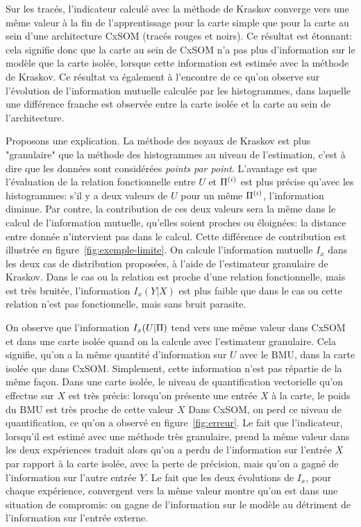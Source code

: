 Sur les tracés, l'indicateur calculé avec la méthode de Kraskov converge vers une même valeur à la fin de l'apprentissage pour la carte simple que pour la carte au sein d'une architecture CxSOM (tracés rouges et noirs). Ce résultat est étonnant: cela signifie donc que la carte au sein de CxSOM n'a pas plus d'information sur le modèle que la carte isolée, lorsque cette information est estimée avec la méthode de Kraskov. Ce résultat va également à l'encontre de ce qu'on observe sur l'évolution de l'information mutuelle calculée par les histogrammes, dans laquelle une différence franche est observée entre la carte isolée et la carte au sein de l'architecture.

Proposons une explication.
La méthode des noyaux de Kraskov est plus "granulaire" que la méthode des histogrammes au niveau de l'estimation, c'est à dire que les données sont considérées \emph{points par point}. L'avantage est que l'évaluation de la relation fonctionnelle entre $U$ et $\Pi^{({i})}$ est plus précise qu'avec les histogrammes: s'il y a deux valeurs de $U$ pour un même $\Pi^{({i})}$, l'information diminue. Par contre, la contribution de ces deux valeurs sera la même dans le calcul de l'information mutuelle, qu'elles soient proches ou éloignées: la distance entre donnée n'intervient pas dans le calcul. Cette différence de contribution est illustrée en figure~\ref{fig:exemple-limite}. On calcule l'information mutuelle $I_x$ dans les deux cas de distribution proposées, à l'aide de l'estimateur granulaire de Kraskov. Dans le cas ou la relation est proche d'une relation fonctionnelle, mais est très bruitée, l'information $I_x(Y|X)$ est plus faible que dans le cas ou cette relation n'est pas fonctionnelle, mais sans bruit parasite.

On observe que l'information $I_x(U|\Pi)$ tend vers une même valeur dans CxSOM et dans une carte isolée quand on la calcule avec l'estimateur granulaire. Cela signifie, qu'on a la même quantité d'information sur $U$ avec le BMU, dans la carte isolée que dans CxSOM. Simplement, cette information n'est pas répartie de la même façon. 
Dans une carte isolée, le niveau de quantification vectorielle qu'on effectue sur $X$ est très précis: lorsqu'on présente une entrée $X$ à la carte, le poids du BMU est très proche de cette valeur $X$ Dans CxSOM, on perd ce niveau de quantification, ce qu'on a observé en figure~\ref{fig:erreur}. Le fait que l'indicateur, lorsqu'il est estimé avec une méthode très granulaire, prend la même valeur dans les deux expériences traduit alors qu'on a perdu de l'information sur l'entrée $X$ par rapport à la carte isolée, avec la perte de précision, mais qu'on a gagné de l'information sur l'autre entrée $Y$. Le fait que les deux évolutions de $I_x$, pour chaque expérience, convergent vers la même valeur montre qu'on est dans une situation de compromis: on gagne de l'information sur le modèle au détriment de l'information sur l'entrée externe.

